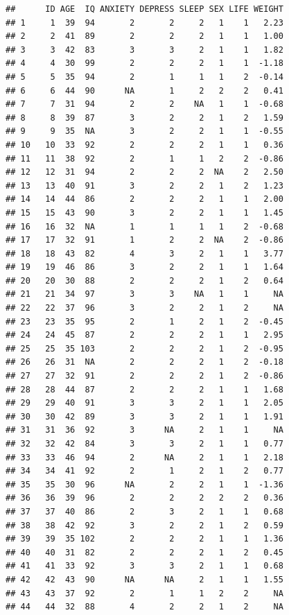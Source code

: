 \documentclass[
]{book}
\begin{document}
\begin{verbatim}
##      ID AGE  IQ ANXIETY DEPRESS SLEEP SEX LIFE WEIGHT
## 1     1  39  94       2       2     2   1    1   2.23
## 2     2  41  89       2       2     2   1    1   1.00
## 3     3  42  83       3       3     2   1    1   1.82
## 4     4  30  99       2       2     2   1    1  -1.18
## 5     5  35  94       2       1     1   1    2  -0.14
## 6     6  44  90      NA       1     2   2    2   0.41
## 7     7  31  94       2       2    NA   1    1  -0.68
## 8     8  39  87       3       2     2   1    2   1.59
## 9     9  35  NA       3       2     2   1    1  -0.55
## 10   10  33  92       2       2     2   1    1   0.36
## 11   11  38  92       2       1     1   2    2  -0.86
## 12   12  31  94       2       2     2  NA    2   2.50
## 13   13  40  91       3       2     2   1    2   1.23
## 14   14  44  86       2       2     2   1    1   2.00
## 15   15  43  90       3       2     2   1    1   1.45
## 16   16  32  NA       1       1     1   1    2  -0.68
## 17   17  32  91       1       2     2  NA    2  -0.86
## 18   18  43  82       4       3     2   1    1   3.77
## 19   19  46  86       3       2     2   1    1   1.64
## 20   20  30  88       2       2     2   1    2   0.64
## 21   21  34  97       3       3    NA   1    1     NA
## 22   22  37  96       3       2     2   1    2     NA
## 23   23  35  95       2       1     2   1    2  -0.45
## 24   24  45  87       2       2     2   1    1   2.95
## 25   25  35 103       2       2     2   1    2  -0.95
## 26   26  31  NA       2       2     2   1    2  -0.18
## 27   27  32  91       2       2     2   1    2  -0.86
## 28   28  44  87       2       2     2   1    1   1.68
## 29   29  40  91       3       3     2   1    1   2.05
## 30   30  42  89       3       3     2   1    1   1.91
## 31   31  36  92       3      NA     2   1    1     NA
## 32   32  42  84       3       3     2   1    1   0.77
## 33   33  46  94       2      NA     2   1    1   2.18
## 34   34  41  92       2       1     2   1    2   0.77
## 35   35  30  96      NA       2     2   1    1  -1.36
## 36   36  39  96       2       2     2   2    2   0.36
## 37   37  40  86       2       3     2   1    1   0.68
## 38   38  42  92       3       2     2   1    2   0.59
## 39   39  35 102       2       2     2   1    1   1.36
## 40   40  31  82       2       2     2   1    2   0.45
## 41   41  33  92       3       3     2   1    1   0.68
## 42   42  43  90      NA      NA     2   1    1   1.55
## 43   43  37  92       2       1     1   2    2     NA
## 44   44  32  88       4       2     2   1    2     NA

\end{verbatim}
\end{document}
